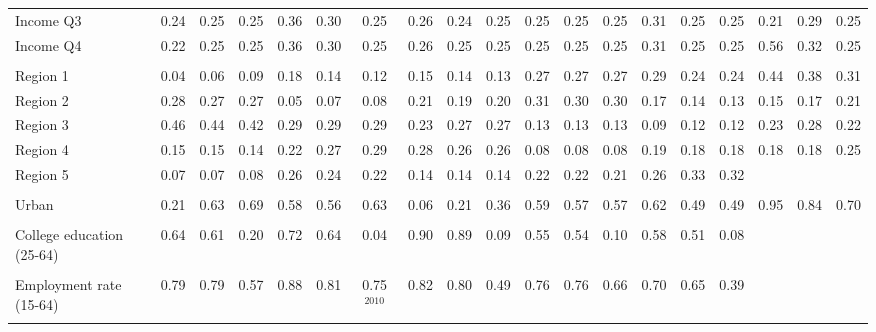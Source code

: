\begin{tabular}{l*{18}{c}}
Income Q3 & 0.24 & 0.25 & 0.25 & 0.36 & 0.30 & 0.25 & 0.26 & 0.24 & 0.25 & 0.25 & 0.25 & 0.25 & 0.31 & 0.25 & 0.25 & 0.21 & 0.29 & 0.25 \\
Income Q4 & 0.22 & 0.25 & 0.25 & 0.36 & 0.30 & 0.25 & 0.26 & 0.25 & 0.25 & 0.25 & 0.25 & 0.25 & 0.31 & 0.25 & 0.25 & 0.56 & 0.32 & 0.25 \\
\\
Region 1 & 0.04 & 0.06 & 0.09 & 0.18 & 0.14 & 0.12 & 0.15 & 0.14 & 0.13 & 0.27 & 0.27 & 0.27 & 0.29 & 0.24 & 0.24 & 0.44 & 0.38 & 0.31 \\
Region 2 & 0.28 & 0.27 & 0.27 & 0.05 & 0.07 & 0.08 & 0.21 & 0.19 & 0.20 & 0.31 & 0.30 & 0.30 & 0.17 & 0.14 & 0.13 & 0.15 & 0.17 & 0.21 \\
Region 3 & 0.46 & 0.44 & 0.42 & 0.29 & 0.29 & 0.29 & 0.23 & 0.27 & 0.27 & 0.13 & 0.13 & 0.13 & 0.09 & 0.12 & 0.12 & 0.23 & 0.28 & 0.22 \\
Region 4 & 0.15 & 0.15 & 0.14 & 0.22 & 0.27 & 0.29 & 0.28 & 0.26 & 0.26 & 0.08 & 0.08 & 0.08 & 0.19 & 0.18 & 0.18 & 0.18 & 0.18 & 0.25 \\
Region 5 & 0.07 & 0.07 & 0.08 & 0.26 & 0.24 & 0.22 & 0.14 & 0.14 & 0.14 & 0.22 & 0.22 & 0.21 & 0.26 & 0.33 & 0.32 & & & \\
\\
Urban & 0.21 & 0.63 & 0.69 & 0.58 & 0.56 & 0.63 & 0.06 & 0.21 & 0.36 & 0.59 & 0.57 & 0.57 & 0.62 & 0.49 & 0.49 & 0.95 & 0.84 & 0.70 \\
\\
College education (25-64) & 0.64 & 0.61 & 0.20 & 0.72 & 0.64 & 0.04 & 0.90 & 0.89 & 0.09 & 0.55 & 0.54 & 0.10 & 0.58 & 0.51 & 0.08 & & & \\
\\
Employment rate (15-64) & 0.79 & 0.79 & 0.57 & 0.88 & 0.81 & 0.75$^\text{2010}$ & 0.82 & 0.80 & 0.49 & 0.76 & 0.76 & 0.66 & 0.70 & 0.65 & 0.39 & & & \\
\\
\bottomrule
\end{tabular}